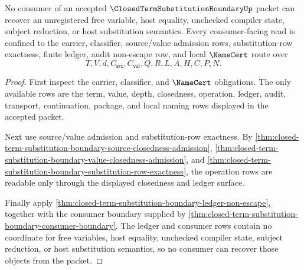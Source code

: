 \begin{theorem}
\label{thm:closed-term-substitution-boundary-consumer-nonescape}
No consumer of an accepted $\ClosedTermSubstitutionBoundaryUp$ packet can recover an unregistered free variable, host equality, unchecked compiler state, subject reduction, or host substitution semantics. Every consumer-facing read is confined to the carrier, classifier, source/value admission rows, substitution-row exactness, finite ledger, audit non-escape row, and local $\NameCert$ route over
$$
T,V,d,C_{\mathsf{src}},C_{\mathsf{val}},Q,R,L,A,H,C,P,N.
$$
\end{theorem}
\begin{proof}
First inspect the carrier, classifier, and $\NameCert$ obligations. The only available rows are the term, value, depth, closedness, operation, ledger, audit, transport, continuation, package, and local naming rows displayed in the accepted packet.

Next use source/value admission and substitution-row exactness. By \autoref{thm:closed-term-substitution-boundary-source-closedness-admission}, \autoref{thm:closed-term-substitution-boundary-value-closedness-admission}, and \autoref{thm:closed-term-substitution-boundary-substitution-row-exactness}, the operation rows are readable only through the displayed closedness and ledger surface.

Finally apply \autoref{thm:closed-term-substitution-boundary-ledger-non-escape}, together with the consumer boundary supplied by \autoref{thm:closed-term-substitution-boundary-consumer-boundary}. The ledger and consumer rows contain no coordinate for free variables, host equality, unchecked compiler state, subject reduction, or host substitution semantics, so no consumer can recover those objects from the packet.
\end{proof}

